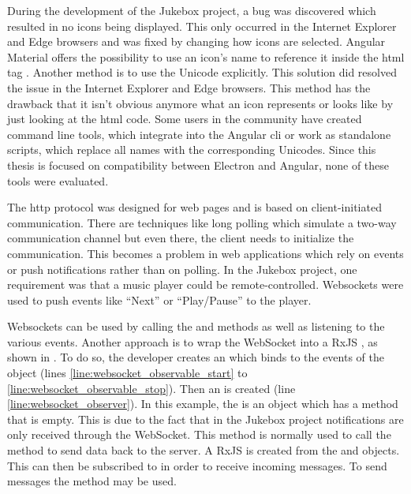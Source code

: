 During the development of the Jukebox project, a bug was discovered which resulted in no icons being displayed. This only occurred in the Internet Explorer and Edge browsers and was fixed by changing how icons are selected. Angular Material offers the possibility to use an icon's name to reference it inside the \gls{html} tag \zB {}. Another method is to use the Unicode explicitly. This solution did resolved the issue in the Internet Explorer and Edge browsers. This method has the drawback that it isn't obvious anymore what an icon represents or looks like by just looking at the \gls{html} code. Some users in the community have created command line tools, which integrate into the Angular \gls{cli} or work as standalone scripts, which replace all names with the corresponding Unicodes. Since this thesis is focused on compatibility between Electron and Angular, none of these tools were evaluated. \cite{materialIcons}



The \gls{http} protocol was designed for web pages and is based on client-initiated communication. There are techniques like long polling which simulate a two-way communication channel but even there, the client needs to initialize the communication. This becomes a problem in web applications which rely on events or push notifications rather than on polling. In the Jukebox project, one requirement was that a music player could be remote-controlled. Websockets were used to push events like \enquote{Next} or \enquote{Play/Pause} to the player.

Websockets can be used by calling the  and  methods as well as listening to the various events. Another approach is to wrap the WebSocket into a RxJS , as shown in  \cite{rxjs} \cite{js_websockets}. To do so, the developer creates an  which binds to the events of the  object (lines \ref{line:websocket_observable_start} to \ref{line:websocket_observable_stop}). Then an  is created (line \ref{line:websocket_observer}). In this example, the  is an object which has a  method that is empty. This is due to the fact that in the Jukebox project notifications are only received through the WebSocket. This  method is normally used to call the  method to send data back to the server. A RxJS  is created from the  and  objects. This  can then be subscribed to in order to receive incoming messages. To send messages the  method may be used.

